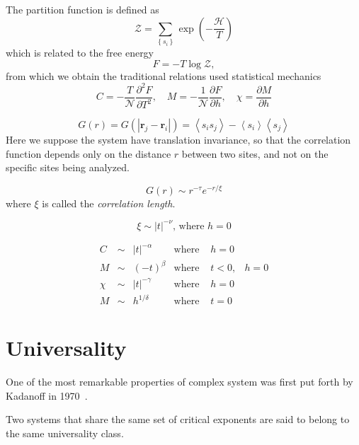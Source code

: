 The partition function is defined as 
\begin{equation}
    \mathcal{Z}=
    \sum_{\left\{ s_{i}\right\} }\exp\left(-\frac{\mathcal{H}}{T}\right)
\end{equation}
which is related to the free energy
\begin{equation}
    F=-T\log\mathcal{Z},
\end{equation}
from which we obtain the traditional relations used statistical mechanics
\begin{equation}
    C=-\frac{T}{\mathcal{N}}\frac{\partial^{2}F}{\partial T^{2}},
    \,\,\,\,\,\,
    M=-\frac{1}{\mathcal{N}}\frac{\partial F}{\partial h},
    \,\,\,\,\,\,
    \chi=\frac{\partial M}{\partial h}
\end{equation}

\begin{equation}
    G\left(r\right)=
    G\left(\left|\mathbf{r}_{j}-\mathbf{r}_{i}\right|\right)=
    \left\langle s_{i}s_{j}\right\rangle -
    \left\langle s_{i}\right\rangle \left\langle s_{j}\right\rangle 
\end{equation}
Here we suppose the system have translation invariance, so that the correlation
function depends only on the distance $r$ between two sites, and not on the
specific sites being analyzed.

\begin{equation}
    G\left(r\right)\sim r^{-\tau}e^{-r/\xi}
\end{equation}
where $\xi$ is called the \textit{correlation length}.

\begin{equation}
    \xi\sim\left|t\right|^{-\nu}\mbox{, where }h=0
\end{equation}

\begin{equation}
    \begin{array}{cccccc}
        C & \sim & \left|t\right|^{-\alpha} & \mbox{where } & h=0\\
        M & \sim & {\left(-t\right)}^{\beta} & \mbox{where } & t<0, & h=0\\
        \chi & \sim & \left|t\right|^{-\gamma} & \mbox{where } & h=0\\
        M & \sim & h^{1/\delta} & \mbox{where } & t=0
    \end{array}
\end{equation}

\section{Universality}
\label{sec:universality}

One of the most remarkable properties of complex system was first put forth by
Kadanoff in 1970~\cite{Kadanoff1971}.

Two systems that share the same set of critical exponents are said to belong to
the same universality class.
